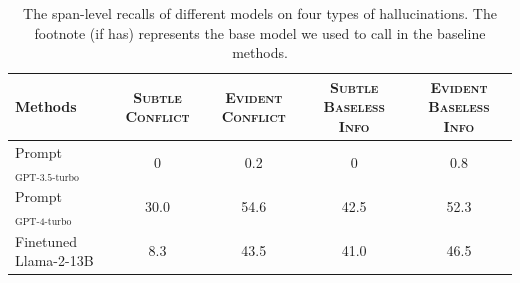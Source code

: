 

\begin{table}[!ht]
\scriptsize
\centering
    \begin{tabular}{l|cccc}
    \toprule
    Methods  & \textsc{Subtle Conflict} & \textsc{Evident Conflict} & \textsc{Subtle Baseless Info} & \textsc{Evident Baseless Info}  \\

     \midrule
     Prompt$_\textrm{GPT-3.5-turbo}$  & 0   & 0.2  & 0  & 0.8 \\
     Prompt$_\textrm{GPT-4-turbo}$  & 30.0  & 54.6 & 42.5 & 52.3 \\
     Finetuned Llama-2-13B & 8.3 & 43.5 & 41.0 & 46.5  \\
    \bottomrule
    \end{tabular}
    \caption{The span-level recalls of different models on four types of hallucinations. The footnote (if has) represents the base model we used to call in the baseline methods. }
    \label{tab:6-type-result}
\end{table}
